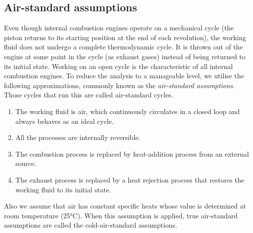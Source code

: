 \documentclass[class=report, crop=false, 12pt,a4paper]{standalone}
\begin{document}
\subsection{Air-standard assumptions}
Even though internal combustion engines operate on a mechanical cycle (the piston returns to its starting position at the end of each revolution), the working fluid does not undergo a complete thermodynamic cycle. It is thrown out of the engine at some point in the cycle (as exhaust gases) instead of being returned to its initial state. Working on an open cycle is the characteristic of all internal combustion engines. To reduce the analysis to a manageable level, we utilise the following approximations, commonly known as the \emph{air-standard assumptions.} Those cycles that run this are called air-standard cycles.
\begin{enumerate}[noitemsep]
  \item The working fluid is air, which continuously circulates in a closed loop and always behaves as an ideal cycle.
  \item All the processes are internally reversible.
  \item The combustion process is replaced by heat-addition process from an external source.
  \item The exhaust process is replaced by a heat rejection process that restores the working fluid to its initial state.
\end{enumerate}
Also we assume that air has constant specific heats whose value is determined at room temperature (25\si{\celsius}). When this assumption is applied, true air-standard assumptions are called the cold-air-standard assumptions.
\end{document}
